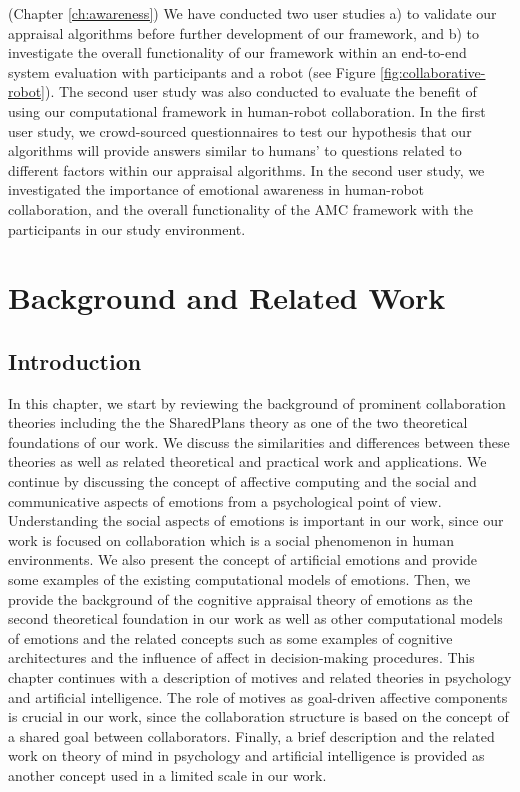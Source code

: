 \documentclass[12pt]{report}
\begin{document}
\begin{enumerate}
  (Chapter \ref{ch:awareness}) We have conducted two user studies a) to validate
  our appraisal algorithms before further development of our framework, and b)
  to investigate the overall functionality of our framework within an end-to-end
  system evaluation with participants and a robot (see Figure
  \ref{fig:collaborative-robot}). The second user study was also conducted to
  evaluate the benefit of using our computational framework in human-robot
  collaboration. In the first user study, we crowd-sourced questionnaires to
  test our hypothesis that our algorithms will provide answers similar to
  humans' to questions related to different factors within our appraisal
  algorithms. In the second user study, we investigated the importance of
  emotional awareness in human-robot collaboration, and the overall
  functionality of the AMC framework with the participants in our study
  environment.
\end{enumerate}

\chapter{Background and Related Work}
\label{ch:background}

\vspace*{-5mm}
\section{Introduction}
\vspace*{-3mm}
In this chapter, we start by reviewing the background of prominent collaboration
theories including the the SharedPlans theory \cite{grosz:plans-discourse} as
one of the two theoretical foundations of our work. We discuss the similarities
and differences between these theories as well as related theoretical and
practical work and applications. We continue by discussing the concept of
affective computing and the social and communicative aspects of emotions from a
psychological point of view. Understanding the social aspects of emotions is
important in our work, since our work is focused on collaboration which is a
social phenomenon in human environments. We also present the concept of
artificial emotions and provide some examples of the existing computational
models of emotions. Then, we provide the background of the cognitive appraisal
theory of emotions as the second theoretical foundation in our work as well as
other computational models of emotions and the related concepts such as some
examples of cognitive architectures and the influence of affect in
decision-making procedures. This chapter continues with a description of motives
and related theories in psychology and artificial intelligence. The role of
motives as goal-driven affective components is crucial in our work, since the
collaboration structure is based on the concept of a shared goal between
collaborators. Finally, a brief description and the related work on theory of
mind in psychology and artificial intelligence is provided as another concept
used in a limited scale in our work.
\end{document}
